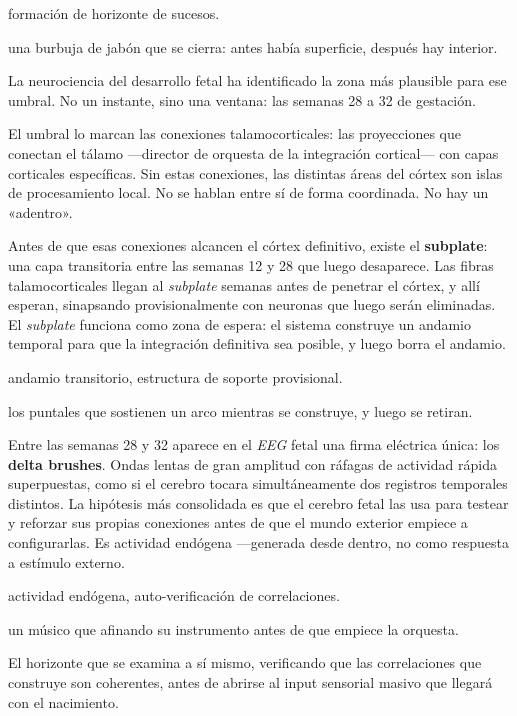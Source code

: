\begin{fisica}
 formación de horizonte de sucesos.

 una burbuja de jabón que se cierra: antes había superficie, después hay interior.
\end{fisica}
\noindent La neurociencia del desarrollo fetal ha identificado la zona más plausible para ese umbral. No un instante, sino una ventana: las semanas 28 a 32 de gestación.

El umbral lo marcan las conexiones talamocorticales: las proyecciones que conectan el tálamo —director de orquesta de la integración cortical— con capas corticales específicas. Sin estas conexiones, las distintas áreas del córtex son islas de procesamiento local. No se hablan entre sí de forma coordinada. No hay un «adentro».

Antes de que esas conexiones alcancen el córtex definitivo, existe el \textbf{subplate}: una capa transitoria entre las semanas 12 y 28 que luego desaparece. Las fibras talamocorticales llegan al \emph{subplate} semanas antes de penetrar el córtex, y allí esperan, sinapsando provisionalmente con neuronas que luego serán eliminadas. El \emph{subplate} funciona como zona de espera: el sistema construye un andamio temporal para que la integración definitiva sea posible, y luego borra el andamio.

\begin{fisica}
 andamio transitorio, estructura de soporte provisional.

 los puntales que sostienen un arco mientras se construye, y luego se retiran.
\end{fisica}
Entre las semanas 28 y 32 aparece en el \emph{EEG} fetal una firma eléctrica única: los \textbf{delta brushes}. Ondas lentas de gran amplitud con ráfagas de actividad rápida superpuestas, como si el cerebro tocara simultáneamente dos registros temporales distintos. La hipótesis más consolidada es que el cerebro fetal las usa para testear y reforzar sus propias conexiones antes de que el mundo exterior empiece a configurarlas. Es actividad endógena —generada desde dentro, no como respuesta a estímulo externo.

\begin{fisica}
 actividad endógena, auto-verificación de correlaciones.

 un músico que afinando su instrumento antes de que empiece la orquesta.
\end{fisica}
El horizonte que se examina a sí mismo, verificando que las correlaciones que construye son coherentes, antes de abrirse al input sensorial masivo que llegará con el nacimiento.

